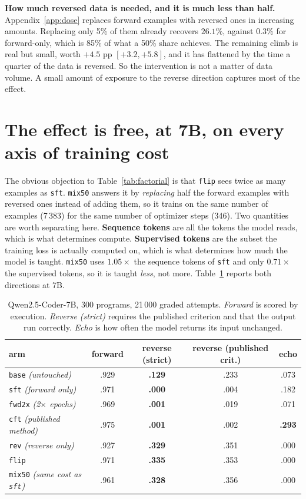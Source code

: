 \documentclass{article}
\newcommand{\arm}[1]{\texttt{#1}}
\begin{document}
\textbf{How much reversed data is needed, and it is much less than half.}
Appendix~\ref{app:dose} replaces forward examples with reversed ones in increasing amounts.
Replacing only 5\% of them already recovers $26.1\%$, against $0.3\%$ for forward-only,
which is 85\% of what a 50\% share achieves. The remaining climb is real but small, worth
$+4.5$ pp $[+3.2,+5.8]$, and it has flattened by the time a quarter of the data is
reversed. So the intervention is not a matter of data volume. A small amount of exposure to
the reverse direction captures most of the effect.


\section{The effect is free, at 7B, on every axis of training cost}
\label{sec:budget}

The obvious objection to Table~\ref{tab:factorial} is that \arm{flip} sees twice as many
examples as \arm{sft}. \arm{mix50} answers it by \emph{replacing} half the forward examples
with reversed ones instead of adding them, so it trains on the same number of examples
(7\,383) for the same number of optimizer steps (346). Two quantities are worth separating
here. \textbf{Sequence tokens} are all the tokens the model reads, which is what determines
compute. \textbf{Supervised tokens} are the subset the training loss is actually computed
on, which is what determines how much the model is taught. \arm{mix50} uses $1.05\times$
the sequence tokens of \arm{sft} and only $0.71\times$ the supervised tokens, so it is
taught \emph{less}, not more. Table~\ref{tab:main7b} reports both directions at 7B.

\begin{table}[t]
\centering\small
\caption{Qwen2.5-Coder-7B, 300 programs, 21\,000 graded attempts. \emph{Forward} is scored
by execution. \emph{Reverse (strict)} requires the published criterion and that the output
run correctly. \emph{Echo} is how often the model returns its input unchanged.}
\label{tab:main7b}
\begin{tabular}{lcccc}
\toprule
arm & forward & \textbf{reverse (strict)} & reverse (published crit.) & echo \\
\midrule
\arm{base} \emph{(untouched)}      & .929 & \textbf{.129} & .233 & .073 \\
\arm{sft} \emph{(forward only)}    & .971 & \textbf{.000} & .004 & .182 \\
\arm{fwd2x} \emph{(2$\times$ epochs)} & .969 & \textbf{.001} & .019 & .071 \\
\arm{cft} \emph{(published method)} & .975 & \textbf{.001} & .002 & \textbf{.293} \\
\arm{rev} \emph{(reverse only)}    & .927 & \textbf{.329} & .351 & .000 \\
\arm{flip}                         & .971 & \textbf{.335} & .353 & .000 \\
\arm{mix50} \emph{(same cost as \arm{sft})} & .961 & \textbf{.328} & .356 & .000 \\
\bottomrule
\end{tabular}
\end{table}
\end{document}
